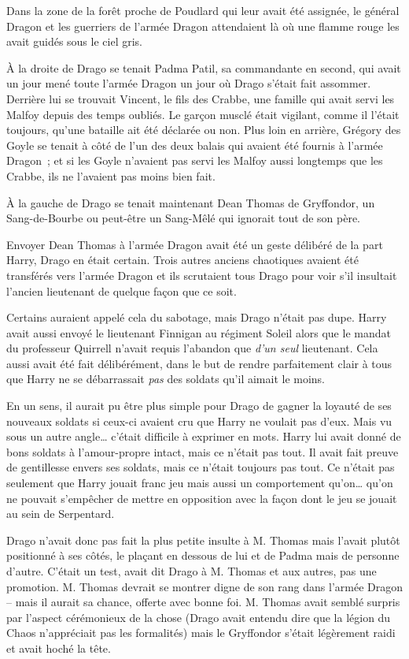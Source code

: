 \later

Dans la zone de la forêt proche de Poudlard qui leur avait été assignée, le général Dragon et les guerriers de l'armée Dragon attendaient là où une flamme rouge les avait guidés sous le ciel gris.

À la droite de Drago se tenait Padma Patil, sa commandante en second, qui avait un jour mené toute l'armée Dragon un jour où Drago s'était fait assommer.
Derrière lui se trouvait Vincent, le fils des Crabbe, une famille qui avait servi les Malfoy depuis des temps oubliés.
Le garçon musclé était vigilant, comme il l'était toujours, qu'une bataille ait été déclarée ou non.
Plus loin en arrière, Grégory des Goyle se tenait à côté de l'un des deux balais qui avaient été fournis à l'armée Dragon~; et si les Goyle n'avaient pas servi les Malfoy aussi longtemps que les Crabbe, ils ne l'avaient pas moins bien fait.

À la gauche de Drago se tenait maintenant Dean Thomas de Gryffondor, un Sang-de-Bourbe ou peut-être un Sang-Mêlé qui ignorait tout de son père.

Envoyer Dean Thomas à l'armée Dragon avait été un geste délibéré de la part Harry, Drago en était certain.
Trois autres anciens chaotiques avaient été transférés vers l'armée Dragon et ils scrutaient tous Drago pour voir s'il insultait l'ancien lieutenant de quelque façon que ce soit.

Certains auraient appelé cela du sabotage, mais Drago n'était pas dupe.
Harry avait aussi envoyé le lieutenant Finnigan au régiment Soleil alors que le mandat du professeur Quirrell n'avait requis l'abandon que \emph{d'un seul} lieutenant.
Cela aussi avait été fait délibérément, dans le but de rendre parfaitement clair à tous que Harry ne se débarrassait \emph{pas} des soldats qu'il aimait le moins.

En un sens, il aurait pu être plus simple pour Drago de gagner la loyauté de ses nouveaux soldats si ceux-ci avaient cru que Harry ne voulait pas d'eux.
Mais vu sous un autre angle… c'était difficile à exprimer en mots.
Harry lui avait donné de bons soldats à l'amour-propre intact, mais ce n'était pas tout.
Il avait fait preuve de gentillesse envers ses soldats, mais ce n'était toujours pas tout.
Ce n'était pas seulement que Harry jouait franc jeu mais aussi un comportement qu'on… qu'on ne pouvait s'empêcher de mettre en opposition avec la façon dont le jeu se jouait au sein de Serpentard.

Drago n'avait donc pas fait la plus petite insulte à M. Thomas mais l'avait plutôt positionné à ses côtés, le plaçant en dessous de lui et de Padma mais de personne d'autre.
C'était un test, avait dit Drago à M. Thomas et aux autres, pas une promotion.
M. Thomas devrait se montrer digne de son rang dans l'armée Dragon -- mais il aurait sa chance, offerte avec bonne foi.
M. Thomas avait semblé surpris par l'aspect cérémonieux de la chose (Drago avait entendu dire que la légion du Chaos n'appréciait pas les formalités) mais le Gryffondor s'était légèrement raidi et avait hoché la tête.

